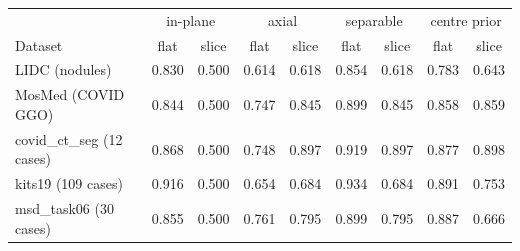 \begin{tabular}{lcccccccc}
\toprule
& \multicolumn{2}{c}{in-plane} & \multicolumn{2}{c}{axial} & \multicolumn{2}{c}{separable} & \multicolumn{2}{c}{centre prior} \\
Dataset & flat & slice & flat & slice & flat & slice & flat & slice \\
\midrule
LIDC (nodules) & 0.830 & 0.500 & 0.614 & 0.618 & 0.854 & 0.618 & 0.783 & 0.643 \\
MosMed (COVID GGO) & 0.844 & 0.500 & 0.747 & 0.845 & 0.899 & 0.845 & 0.858 & 0.859 \\
covid\_ct\_seg (12 cases) & 0.868 & 0.500 & 0.748 & 0.897 & 0.919 & 0.897 & 0.877 & 0.898 \\
kits19 (109 cases) & 0.916 & 0.500 & 0.654 & 0.684 & 0.934 & 0.684 & 0.891 & 0.753 \\
msd\_task06 (30 cases) & 0.855 & 0.500 & 0.761 & 0.795 & 0.899 & 0.795 & 0.887 & 0.666 \\
\bottomrule
\end{tabular}
